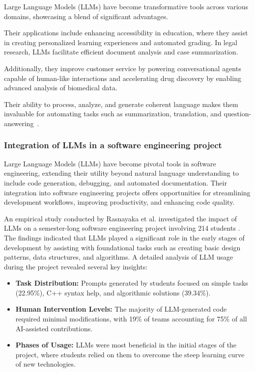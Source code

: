Large Language Models (LLMs) have become transformative tools across various domains, showcasing a blend of significant advantages. 

Their applications include enhancing accessibility in education, where they assist in creating personalized learning experiences and automated grading. In legal research, LLMs facilitate efficient document analysis and case summarization. 

Additionally, they improve customer service by powering conversational agents capable of human-like interactions and accelerating drug discovery by enabling advanced analysis of biomedical data. 

Their ability to process, analyze, and generate coherent language makes them invaluable for automating tasks such as summarization, translation, and question-answering~\cite{application_llms}.

\subsubsection{Integration of LLMs in a software engineering project}
Large Language Models (LLMs) have become pivotal tools in software engineering, extending their utility beyond natural language understanding to include code generation, debugging, and automated documentation. Their integration into software engineering projects offers opportunities for streamlining development workflows, improving productivity, and enhancing code quality.

An empirical study conducted by Rasnayaka et al. investigated the impact of LLMs on a semester-long software engineering project involving 214 students \cite{8}. The findings indicated that LLMs played a significant role in the early stages of development by assisting with foundational tasks such as creating basic design patterns, data structures, and algorithms. A detailed analysis of LLM usage during the project revealed several key insights:
\begin{itemize}
    \item \textbf{Task Distribution:} Prompts generated by students focused on simple tasks (22.95\%), C++ syntax help, and algorithmic solutions (39.34\%).
    \item \textbf{Human Intervention Levels:} The majority of LLM-generated code required minimal modifications, with 19\% of teams accounting for 75\% of all AI-assisted contributions.
    \item \textbf{Phases of Usage:} LLMs were most beneficial in the initial stages of the project, where students relied on them to overcome the steep learning curve of new technologies.
\end{itemize}

